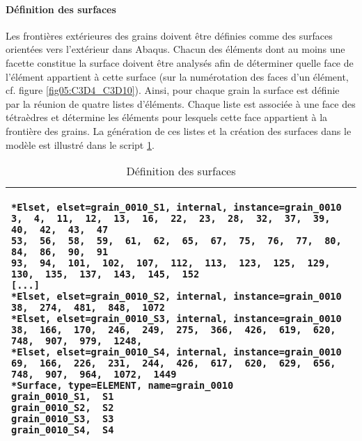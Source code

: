 \paragraph{Définition des surfaces\\}
Les frontières extérieures des grains doivent être définies comme des surfaces orientées vers l'extérieur dans Abaqus. Chacun des éléments dont au moins une facette constitue la surface doivent être analysés afin de déterminer quelle face de l'élément appartient à cette surface (sur la numérotation des faces d'un élément, cf. figure \ref{fig05:C3D4_C3D10}). Ainsi, pour chaque grain la surface est définie par la réunion de quatre listes d'éléments. Chaque liste est associée à une face des tétraèdres et détermine les éléments pour lesquels cette face appartient à la frontière des grains. La génération de ces listes et la création des surfaces dans le modèle est illustré dans le script \ref{script05:surfaces}.
\begin{table}[h]\centering
	\begin{tabular}{p{}}
		\hline
		\begin{lstlisting}[language={}, breaklines=true]
*Elset, elset=grain_0010_S1, internal, instance=grain_0010
3,  4,  11,  12,  13,  16,  22,  23,  28,  32,  37,  39,  40,  42,  43,  47
53,  56,  58,  59,  61,  62,  65,  67,  75,  76,  77,  80,  84,  86,  90,  91
93,  94,  101,  102,  107,  112,  113,  123,  125,  129,  130,  135,  137,  143,  145,  152
[...]
*Elset, elset=grain_0010_S2, internal, instance=grain_0010
38,  274,  481,  848,  1072
*Elset, elset=grain_0010_S3, internal, instance=grain_0010
38,  166,  170,  246,  249,  275,  366,  426,  619,  620,  748,  907,  979,  1248,
*Elset, elset=grain_0010_S4, internal, instance=grain_0010
69,  166,  226,  231,  244,  426,  617,  620,  629,  656,  748,  907,  964,  1072,  1449
*Surface, type=ELEMENT, name=grain_0010
grain_0010_S1,  S1
grain_0010_S2,  S2
grain_0010_S3,  S3
grain_0010_S4,  S4
		\end{lstlisting}\\
		\hline
	\end{tabular}
	\caption{\label{script05:surfaces}Définition des surfaces}
\end{table}

